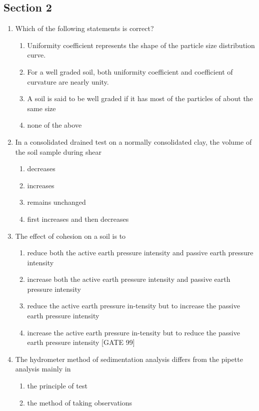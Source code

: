 \documentclass[11pt,a4paper]{article}
\begin{document}
\subsection*{Section 2}
\begin{enumerate}
\item{Which of the following statements is correct?}
\begin{enumerate}[label=\Alph*.]
\item{Uniformity coefficient represents the shape of the particle size distribution curve.}
\item{For a well graded soil, both uniformity coefficient and coefficient of curvature are nearly unity.}
\item{A soil is said to be well graded if it has most of the particles of about the same size}
\item{none of the above}
\end{enumerate}
\item{In a consolidated drained test on a normally consolidated clay, the volume of the soil sample during shear}
\begin{enumerate}[label=\Alph*.]
\item{decreases}
\item{increases}
\item{remains unchanged}
\item{first increases and then decreases}
\end{enumerate}
\item{The effect of cohesion on a soil is to}
\begin{enumerate}[label=\Alph*.]
\item{reduce both the active earth pressure intensity and passive earth pressure intensity}
\item{increase both the active earth pressure intensity and passive earth pressure intensity}
\item{reduce the active earth pressure in-tensity but to increase the passive earth pressure intensity}
\item{increase the active earth pressure in-tensity but to reduce the passive earth pressure intensity [GATE 99]}
\end{enumerate}
\item{The hydrometer method of sedimentation analysis differs from the pipette analysis mainly in}
\begin{enumerate}[label=\Alph*.]
\item{the principle of test}
\item{the method of taking observations}

\end{enumerate}
\end{enumerate}
\end{document}
